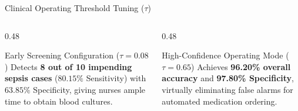 \documentclass[aspectratio=169, 10pt]{beamer}
\begin{document}
\begin{frame}{Clinical Operating Threshold Tuning ($\tau$)}
    \begin{columns}[t]
        \begin{column}{0.48\textwidth}
            \begin{alertblock}{Early Screening Configuration ($\tau=0.08$)}
                \scriptsize
                Detects \textbf{8 out of 10 impending sepsis cases} ($80.15\%$ Sensitivity) with $63.85\%$ Specificity, giving nurses ample time to obtain blood cultures.
            \end{alertblock}
        \end{column}
        \begin{column}{0.48\textwidth}
            \begin{exampleblock}{High-Confidence Operating Mode ($\tau=0.65$)}
                \scriptsize
                Achieves \textbf{96.20\% overall accuracy} and \textbf{97.80\% Specificity}, virtually eliminating false alarms for automated medication ordering.
            \end{exampleblock}
        \end{column}
    \end{columns}
\end{frame}
\end{document}

